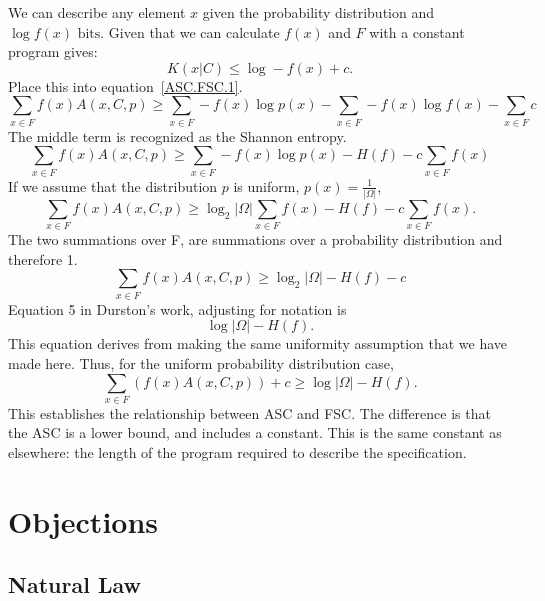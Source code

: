 We can describe any element $x$ given the probability distribution and $\log f(x) \mbox{ bits}$.
Given that we can calculate $f(x)$ and $F$ with a constant program gives:
\begin{equation}
    K(x|C) \leq \log -f(x) + c  \mbox{.}
\end{equation}
Place this into equation~\ref{ASC.FSC.1}.
\begin{equation}
    \sum_{x \in F} f(x) A(x,C,p) 
    \geq \sum_{x \in F} -f(x)\log p(x) - \sum_{x \in F} - f(x) \log f(x) - \sum_{x \in F} c
\end{equation}
The middle term is recognized as the Shannon entropy.
\begin{equation}
    \sum_{x \in F} f(x) A(x,C,p) 
    \geq \sum_{x \in F} -f(x) \log p(x) - H(f) - c \sum_{x \in F} f(x)
\end{equation}
If we assume that the distribution $p$ is uniform, $p(x) = \frac{1}{|\Omega|}$,
\begin{equation}
    \sum_{x \in F} f(x) A(x,C,p) 
    \geq \log_2 |\Omega| \sum_{x \in F} f(x) - H(f) - c \sum_{x \in F} f(x)  \mbox{.}
\end{equation}
The two summations over F, are summations over a probability distribution and therefore 1.
\begin{equation}
    \sum_{x \in F} f(x) A(x,C,p) 
    \geq \log_2 |\Omega| - H(f) - c 
\end{equation}
Equation 5 in Durston's work, adjusting for notation is
\begin{equation}
    \log |\Omega| - H(f)  \mbox{.}
\end{equation}
This equation derives from making the same uniformity assumption that we have made here.
Thus, for the uniform probability distribution case,
\begin{equation}
    \sum_{x \in F} (f(x) A(x,C,p) ) + c
    \geq \log |\Omega| - H(f)  \mbox{.}
\end{equation}
This establishes the relationship between ASC and FSC.
The difference is that the ASC is a lower bound, and includes a constant.
This is the same constant as elsewhere: the length of the program required to describe the specification.

\section{Objections}

\subsection{Natural Law}

